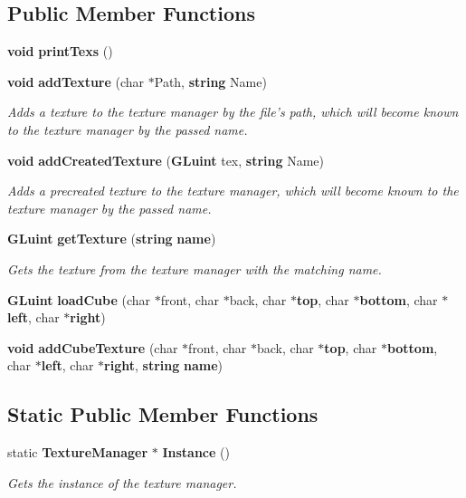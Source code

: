 \subsection*{Public Member Functions}
\begin{DoxyCompactItemize}
\item 
{\bf void} {\bf print\+Texs} ()
\item 
{\bf void} {\bf add\+Texture} (char $\ast$Path, {\bf string} Name)
\begin{DoxyCompactList}\small\item\em Adds a texture to the texture manager by the file's path, which will become known to the texture manager by the passed name. \end{DoxyCompactList}\item 
{\bf void} {\bf add\+Created\+Texture} ({\bf G\+Luint} tex, {\bf string} Name)
\begin{DoxyCompactList}\small\item\em Adds a precreated texture to the texture manager, which will become known to the texture manager by the passed name. \end{DoxyCompactList}\item 
{\bf G\+Luint} {\bf get\+Texture} ({\bf string} {\bf name})
\begin{DoxyCompactList}\small\item\em Gets the texture from the texture manager with the matching name. \end{DoxyCompactList}\item 
{\bf G\+Luint} {\bf load\+Cube} (char $\ast$front, char $\ast$back, char $\ast${\bf top}, char $\ast${\bf bottom}, char $\ast${\bf left}, char $\ast${\bf right})
\item 
{\bf void} {\bf add\+Cube\+Texture} (char $\ast$front, char $\ast$back, char $\ast${\bf top}, char $\ast${\bf bottom}, char $\ast${\bf left}, char $\ast${\bf right}, {\bf string} {\bf name})
\end{DoxyCompactItemize}
\subsection*{Static Public Member Functions}
\begin{DoxyCompactItemize}
\item 
static {\bf Texture\+Manager} $\ast$ {\bf Instance} ()
\begin{DoxyCompactList}\small\item\em Gets the instance of the texture manager. \end{DoxyCompactList}\end{DoxyCompactItemize}
